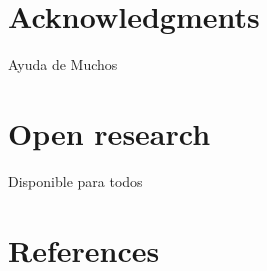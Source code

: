 \documentclass[
]{agujournal2019}
\newlength{\cslhangindent}
\newlength{\cslentryspacingunit} %
\newenvironment{CSLReferences}[2] %
 {%
  \setlength{\parindent}{0pt}
  \ifodd #1
  \let\oldpar\par
  \def\par{\hangindent=\cslhangindent\oldpar}
  \fi
  \setlength{\parskip}{#2\cslentryspacingunit}
 }%
 {}
\begin{document}
\hypertarget{acknowledgments}{%
\section{Acknowledgments}\label{acknowledgments}}

Ayuda de Muchos

\hypertarget{open-research}{%
\section{Open research}\label{open-research}}

Disponible para todos

\hypertarget{references}{%
\section*{References}\label{references}}

\hypertarget{refs}{}
\begin{CSLReferences}{0}{0}
\vspace{1em}

\end{CSLReferences}
\end{document}
